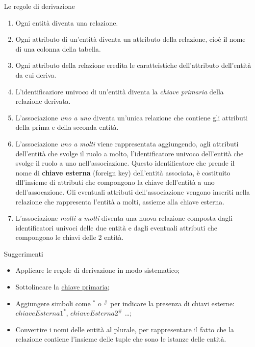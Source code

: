 %
\begin{frame}[allowframebreaks]{Le regole di derivazione}
\begin{enumerate}
    \item Ogni entit\`a diventa una relazione.
    \item Ogni attributo di un'entit\`a diventa un attributo della relazione, cio\`e il nome di una colonna della tabella.
    \item Ogni attributo della relazione eredita le caratteistiche dell'attributo dell'entit\`a da cui deriva.
    \item L'identificaziore univoco di un'entit\`a diventa la \textit{chiave primaria} della relazione derivata.
    \item L'associazione \textit{uno a uno} diventa un'unica relazione che contiene gli attributi della prima e della seconda entit\`a.
    \item L'associazione \textit{uno a molti} viene rappresentata aggiungendo, agli attributi dell'entit\`a che svolge il ruolo a molto, l'identificatore univoco dell'entit\`a che svolge il ruolo a uno nell'associazione. Questo identificatore che prende il nome di \textbf{chiave esterna} (foreign key) dell'entit\`a associata, \`e costituito dll'insieme di attributi che compongono la chiave dell'entit\`a a uno dell'assocazione. Gli eventuali attributi dell'associazione vengono inseriti nella relazione che rappresenta l'entit\`a a molti, assieme alla chiave esterna.
    \item L'associazione \textit{molti a molti} diventa una nuova relazione composta dagli identificatori univoci delle due entit\`a e dagli eventuali attributi che compongono le chiavi delle 2 entit\`a.
\end{enumerate}
\end{frame}
%
\begin{frame}{Suggerimenti}
\begin{itemize}[<+->]
    \item Applicare le regole di derivazione in modo sistematico;
    \item Sottolineare la \underline{chiave primaria};
    \item Aggiungere simboli come $^*$ o $^\#$ per indicare la presenza di chiavi esterne: $chiaveEsterna1^*$, $chiaveEsterna2^\#$ \ldots;
    \item Convertire i nomi delle entit\`a al plurale, per rappresentare il fatto che la relazione contiene l'insieme delle tuple che sono le istanze delle entit\`a.
\end{itemize}
\end{frame}
